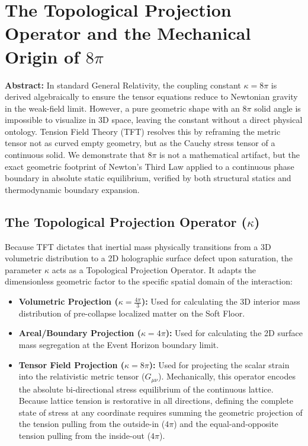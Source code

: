 \chapter{The Topological Projection Operator and the Mechanical Origin of $8\pi$}
\label{app:8pi_origin}

\noindent\textbf{Abstract:} In standard General Relativity, the coupling constant $\kappa = 8\pi$ is derived algebraically to ensure the tensor equations reduce to Newtonian gravity in the weak-field limit. However, a pure geometric shape with an $8\pi$ solid angle is impossible to visualize in 3D space, leaving the constant without a direct physical ontology. Tension Field Theory (TFT) resolves this by reframing the metric tensor not as curved empty geometry, but as the Cauchy stress tensor of a continuous solid. We demonstrate that $8\pi$ is not a mathematical artifact, but the exact geometric footprint of Newton's Third Law applied to a continuous phase boundary in absolute static equilibrium, verified by both structural statics and thermodynamic boundary expansion.

\section{The Topological Projection Operator ($\kappa$)}
Because TFT dictates that inertial mass physically transitions from a 3D volumetric distribution to a 2D holographic surface defect upon saturation, the parameter $\kappa$ acts as a Topological Projection Operator. It adapts the dimensionless geometric factor to the specific spatial domain of the interaction:
\begin{itemize}
    \item \textbf{Volumetric Projection ($\kappa = \frac{4\pi}{3}$):} Used for calculating the 3D interior mass distribution of pre-collapse localized matter on the Soft Floor.
    \item \textbf{Areal/Boundary Projection ($\kappa = 4\pi$):} Used for calculating the 2D surface mass segregation at the Event Horizon boundary limit.
    \item \textbf{Tensor Field Projection ($\kappa = 8\pi$):} Used for projecting the scalar strain into the relativistic metric tensor ($G_{\mu\nu}$). Mechanically, this operator encodes the absolute bi-directional stress equilibrium of the continuous lattice. Because lattice tension is restorative in all directions, defining the complete state of stress at any coordinate requires summing the geometric projection of the tension pulling from the outside-in ($4\pi$) and the equal-and-opposite tension pulling from the inside-out ($4\pi$).
\end{itemize}


